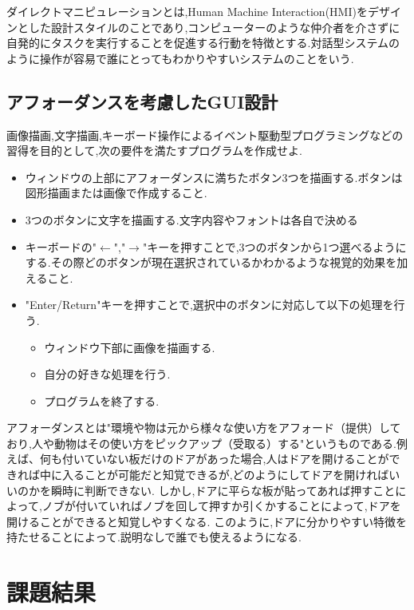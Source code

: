 \documentclass{jarticle}
\begin{document}
	ダイレクトマニピュレーションとは,Human Machine Interaction(HMI)をデザインとした設計スタイルのことであり,コンピューターのような仲介者を介さずに自発的にタスクを実行することを促進する行動を特徴とする.対話型システムのように操作が容易で誰にとってもわかりやすいシステムのことをいう.\cite{direct}
	\subsection{アフォーダンスを考慮したGUI設計}
	\label{subsec:kadai2}

	画像描画,文字描画,キーボード操作によるイベント駆動型プログラミングなどの習得を目的として,次の要件を満たすプログラムを作成せよ.

	\begin{itemize}

	\item ウィンドウの上部にアフォーダンスに満ちたボタン3つを描画する.ボタンは図形描画または画像で作成すること.
	\item 3つのボタンに文字を描画する.文字内容やフォントは各自で決める
	\item キーボードの"$\leftarrow$","$\rightarrow$"キーを押すことで,3つのボタンから1つ選べるようにする.その際どのボタンが現在選択されているかわかるような視覚的効果を加えること.
	\item "Enter/Return"キーを押すことで,選択中のボタンに対応して以下の処理を行う.

	\begin{itemize}
	\item ウィンドウ下部に画像を描画する.
	\item 自分の好きな処理を行う.
	\item プログラムを終了する.
	\end{itemize}

	\end{itemize}
	アフォーダンスとは"環境や物は元から様々な使い方をアフォード（提供）しており,人や動物はその使い方をピックアップ（受取る）する"というものである.例えば、何も付いていない板だけのドアがあった場合,人はドアを開けることができれば中に入ることが可能だと知覚できるが,どのようにしてドアを開ければいいのかを瞬時に判断できない.
しかし,ドアに平らな板が貼ってあれば押すことによって,ノブが付いていればノブを回して押すか引くかすることによって,ドアを開けることができると知覚しやすくなる.
このように,ドアに分かりやすい特徴を持たせることによって.説明なしで誰でも使えるようになる.\cite{affordance}
	\section{課題結果}
\end{document}
